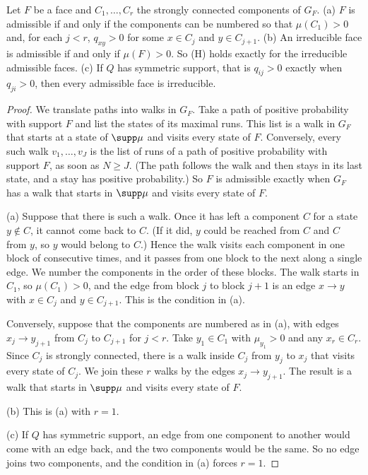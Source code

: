 \begin{lemma}\label{lem:admissible}
Let $F$ be a face and $C_1,\dots,C_r$ the strongly connected components of
$G_F$. \textup{(a)} $F$ is admissible if and only if the components can be
numbered so that $\mu(C_1)>0$ and, for each $j<r$, $q_{xy}>0$ for some $x\in
C_j$ and $y\in C_{j+1}$. \textup{(b)} An irreducible face is admissible if and
only if $\mu(F)>0$. So \textup{(H)} holds exactly for the irreducible admissible
faces. \textup{(c)} If $Q$ has symmetric support, that is $q_{ij}>0$ exactly
when $q_{ji}>0$, then every admissible face is irreducible.
\end{lemma}

\begin{proof}
We translate paths into walks in $G_F$. Take a path of positive probability
with support $F$ and list the states of its maximal runs. This list is a walk
in $G_F$ that starts at a state of $\supp\mu$ and visits every state of $F$.
Conversely, every such walk $v_1,\dots,v_J$ is the list of runs of a path of
positive probability with support $F$, as soon as $N\ge J$. (The path follows the walk and then stays in its last state, and a stay
has positive probability.) So $F$ is admissible exactly when $G_F$ has a walk
that starts in $\supp\mu$ and visits every state of $F$.

(a) Suppose that there is such a walk. Once it has left a component $C$ for a
state $y\notin C$, it cannot come back to $C$. (If it did, $y$ could be reached
from $C$ and $C$ from $y$, so $y$ would belong to $C$.) Hence the walk visits
each component in one block of consecutive times, and it passes from one block
to the next along a single edge. We number the components in the order of these
blocks. The walk starts in $C_1$, so $\mu(C_1)>0$, and the edge from block $j$
to block $j+1$ is an edge $x\to y$ with $x\in C_j$ and $y\in C_{j+1}$. This is
the condition in (a).

Conversely, suppose that the components are numbered as in (a), with edges
$x_j\to y_{j+1}$ from $C_j$ to $C_{j+1}$ for $j<r$. Take $y_1\in C_1$ with
$\mu_{y_1}>0$ and any $x_r\in C_r$. Since $C_j$ is strongly connected, there is
a walk inside $C_j$ from $y_j$ to $x_j$ that visits every state of $C_j$. We
join these $r$ walks by the edges $x_j\to y_{j+1}$. The result is a walk that
starts in $\supp\mu$ and visits every state of $F$.

(b) This is (a) with $r=1$.

(c) If $Q$ has symmetric support, an edge from one component to another would
come with an edge back, and the two components would be the same. So no edge
joins two components, and the condition in (a) forces $r=1$.
\end{proof}

